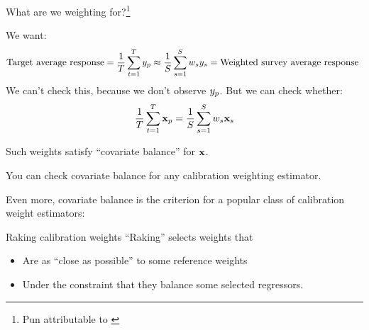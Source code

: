 
\begin{frame}[t]{What are we weighting for?\footnote{Pun attributable to \citet{solon:2015:weightingfor}}}


We want:
$$
\textrm{Target average response} =
\frac{1}{T} \sum_{t=1}^T y_p \approx \frac{1}{S} \sum_{s=1}^S w_s y_s
= \textrm{Weighted survey average response }
$$
We can't check this, because we don't observe $y_p$.  \pause But we can check whether:
$$
    \frac{1}{T} \sum_{t=1}^T \mathbf{x}_p = \frac{1}{S} \sum_{s=1}^S w_s \mathbf{x}_s
$$

Such weights satisfy ``covariate balance'' for $\mathbf{x}$.

You can check covariate balance for any calibration weighting estimator.

\pause
Even more, covariate balance is the criterion for a popular class of calibration
weight estimators:

\begin{block}{Raking calibration weights}
``Raking'' selects weights that
%
\begin{itemize}
    \item Are as ``close as possible'' to some reference weights
    \item Under the constraint that they balance some selected regressors.
\end{itemize}
%
\end{block}



\end{frame}





